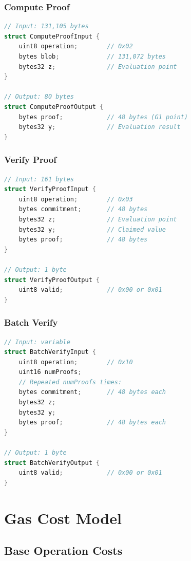 \documentclass[11pt,a4paper]{article}
\theoremstyle{definition}
\begin{document}
\subsubsection{Compute Proof}

\begin{lstlisting}[language=C]
// Input: 131,105 bytes
struct ComputeProofInput {
    uint8 operation;        // 0x02
    bytes blob;             // 131,072 bytes
    bytes32 z;              // Evaluation point
}

// Output: 80 bytes
struct ComputeProofOutput {
    bytes proof;            // 48 bytes (G1 point)
    bytes32 y;              // Evaluation result
}
\end{lstlisting}

\subsubsection{Verify Proof}

\begin{lstlisting}[language=C]
// Input: 161 bytes
struct VerifyProofInput {
    uint8 operation;        // 0x03
    bytes commitment;       // 48 bytes
    bytes32 z;              // Evaluation point
    bytes32 y;              // Claimed value
    bytes proof;            // 48 bytes
}

// Output: 1 byte
struct VerifyProofOutput {
    uint8 valid;            // 0x00 or 0x01
}
\end{lstlisting}

\subsubsection{Batch Verify}

\begin{lstlisting}[language=C]
// Input: variable
struct BatchVerifyInput {
    uint8 operation;        // 0x10
    uint16 numProofs;
    // Repeated numProofs times:
    bytes commitment;       // 48 bytes each
    bytes32 z;
    bytes32 y;
    bytes proof;            // 48 bytes each
}

// Output: 1 byte
struct BatchVerifyOutput {
    uint8 valid;            // 0x00 or 0x01
}
\end{lstlisting}

\section{Gas Cost Model}

\subsection{Base Operation Costs}
\end{document}
